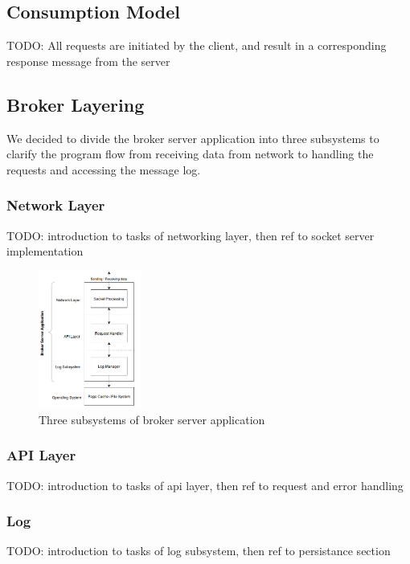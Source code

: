 \subsection{Consumption Model}
TODO: All requests are initiated by the client, and result in a corresponding
response message from the server

\subsection{Broker Layering}
We decided to divide the broker server application into three subsystems to
clarify the program flow from receiving data from network to handling the
requests and accessing the message log. 
\subsubsection{Network Layer}

TODO: introduction to tasks of networking layer, then ref to socket server implementation

\begin{figure}[H]
    \centering
    \includegraphics[width=0.3\textwidth]{images/design-subsystems.png}
    \caption{Three subsystems of broker server application}
    \label{fig:architecture-subsystems.png}
\end{figure}

\subsubsection{API Layer}

TODO: introduction to tasks of api layer, then ref to request and error handling

\subsubsection{Log}

TODO: introduction to tasks of log subsystem, then ref to persistance section




